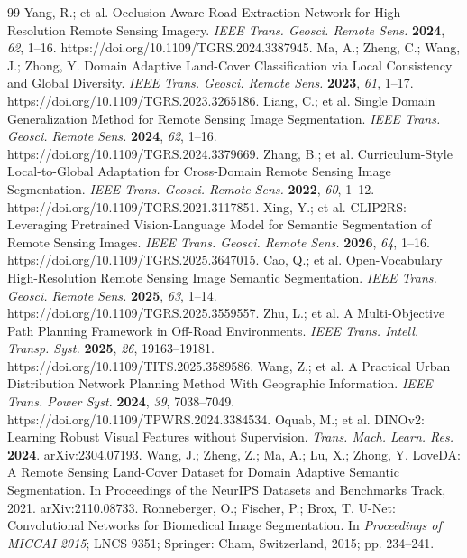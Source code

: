 \begin{thebibliography}{99}
 Yang, R.; et al. Occlusion-Aware Road Extraction Network for High-Resolution Remote Sensing Imagery. \textit{IEEE Trans. Geosci. Remote Sens.} \textbf{2024}, \textit{62}, 1--16. https://doi.org/10.1109/TGRS.2024.3387945.
 Ma, A.; Zheng, C.; Wang, J.; Zhong, Y. Domain Adaptive Land-Cover Classification via Local Consistency and Global Diversity. \textit{IEEE Trans. Geosci. Remote Sens.} \textbf{2023}, \textit{61}, 1--17. https://doi.org/10.1109/TGRS.2023.3265186.
 Liang, C.; et al. Single Domain Generalization Method for Remote Sensing Image Segmentation. \textit{IEEE Trans. Geosci. Remote Sens.} \textbf{2024}, \textit{62}, 1--16. https://doi.org/10.1109/TGRS.2024.3379669.
 Zhang, B.; et al. Curriculum-Style Local-to-Global Adaptation for Cross-Domain Remote Sensing Image Segmentation. \textit{IEEE Trans. Geosci. Remote Sens.} \textbf{2022}, \textit{60}, 1--12. https://doi.org/10.1109/TGRS.2021.3117851.
 Xing, Y.; et al. CLIP2RS: Leveraging Pretrained Vision-Language Model for Semantic Segmentation of Remote Sensing Images. \textit{IEEE Trans. Geosci. Remote Sens.} \textbf{2026}, \textit{64}, 1--16. https://doi.org/10.1109/TGRS.2025.3647015.
 Cao, Q.; et al. Open-Vocabulary High-Resolution Remote Sensing Image Semantic Segmentation. \textit{IEEE Trans. Geosci. Remote Sens.} \textbf{2025}, \textit{63}, 1--14. https://doi.org/10.1109/TGRS.2025.3559557.
 Zhu, L.; et al. A Multi-Objective Path Planning Framework in Off-Road Environments. \textit{IEEE Trans. Intell. Transp. Syst.} \textbf{2025}, \textit{26}, 19163--19181. https://doi.org/10.1109/TITS.2025.3589586.
 Wang, Z.; et al. A Practical Urban Distribution Network Planning Method With Geographic Information. \textit{IEEE Trans. Power Syst.} \textbf{2024}, \textit{39}, 7038--7049. https://doi.org/10.1109/TPWRS.2024.3384534.
 Oquab, M.; et al. DINOv2: Learning Robust Visual Features without Supervision. \textit{Trans. Mach. Learn. Res.} \textbf{2024}. arXiv:2304.07193.
 Wang, J.; Zheng, Z.; Ma, A.; Lu, X.; Zhong, Y. LoveDA: A Remote Sensing Land-Cover Dataset for Domain Adaptive Semantic Segmentation. In Proceedings of the NeurIPS Datasets and Benchmarks Track, 2021. arXiv:2110.08733.
 Ronneberger, O.; Fischer, P.; Brox, T. U-Net: Convolutional Networks for Biomedical Image Segmentation. In \textit{Proceedings of MICCAI 2015}; LNCS 9351; Springer: Cham, Switzerland, 2015; pp. 234--241.

\end{thebibliography}
